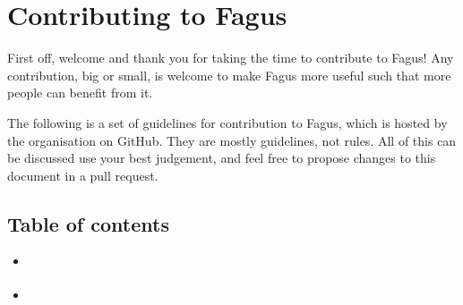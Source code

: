 \documentclass[a4paper,10pt,english]{sphinxmanual}
\begin{document}
\sphinxstepscope


\chapter{Contributing to Fagus}
\label{\detokenize{CONTRIBUTING:contributing-to-fagus}}\label{\detokenize{CONTRIBUTING::doc}}
\sphinxAtStartPar
First off, welcome and thank you for taking the time to contribute to Fagus! Any contribution, big or small, is welcome to make Fagus more useful such that more people can benefit from it.

\sphinxAtStartPar
The following is a set of guidelines for contribution to Fagus, which is hosted by the  organisation on GitHub. They are mostly guidelines, not rules. All of this can be discussed \sphinxhyphen{} use your best judgement, and feel free to propose changes to this document in a pull request.


\section{Table of contents}
\label{\detokenize{CONTRIBUTING:table-of-contents}}
\sphinxAtStartPar
{\hyperref[\detokenize{CONTRIBUTING:fagus-principles}]{}}

\sphinxAtStartPar
{\hyperref[\detokenize{CONTRIBUTING:how-can-i-contribute}]{}}
\begin{itemize}
\item {}
\sphinxAtStartPar
{\hyperref[\detokenize{CONTRIBUTING:reporting-bugs}]{}}

\item {}
\sphinxAtStartPar
{\hyperref[\detokenize{CONTRIBUTING:requesting-new-features}]{}}

\end{itemize}
\end{document}
